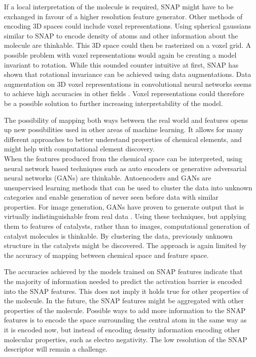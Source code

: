 If a local interpretation of the molecule is required, SNAP might have to be exchanged in favour of a higher resolution 
feature generator.
Other methods of encoding 3D spaces could include voxel representations.
Using spherical gaussians similar to SNAP to encode density of atoms and other information about the molecule are thinkable.
This 3D space could then be rasterized on a voxel grid.
A possible problem with voxel representations would again be creating a model invariant to rotation.
While this sounded counter intuitive at first, SNAP has shown that rotational invariance can be achieved using data augmentations.
Data augmentation on 3D voxel representations in convolutional neural networks seems to achieve high accuracies in 
other fields \cite{7353481}.
Voxel representations could therefore be a possible solution to further increasing interpretability of the model.

The possibility of mapping both ways between the real world and features opens up new possibilities 
used in other areas of machine learning.
It allows for many different approaches to better understand properties of chemical elements, 
and might help with computational element discovery.
\\

When the features produced from the chemical space can be interpreted,
using neural network based techniques such as auto encoders or generative adversarial neural networks (GANs) are thinkable.
Autoencoders and GANs are unsupervised learning methods that can be used to cluster the data into unknown categories 
and enable generation of never seen before data with similar properties.
For image generation, GANs have proven to generate output that is virtually indistinguishable from real data \cite{karras2019stylebased}.
Using these techniques, but applying them to features of catalysts, rather than to images, computational generation of catalyst molecules is thinkable.
By clustering the data, previously unknown structure in the catalysts might be discovered.
The approach is again limited by the accuracy of mapping between chemical space and feature space.

The accuracies achieved by the models trained on SNAP features indicate that 
the majority of information needed to predict the activation barrier is encoded into the SNAP features.
This does not imply it holds true for other properties of the molecule.
In the future, the SNAP features might be aggregated with other properties of the molecule.
Possible ways to add more information to the SNAP features is to encode the space surrounding the 
central atom in the same way as it is encoded now, but instead of encoding density information encoding 
other molecular properties, such as electro negativity.
The low resolution of the SNAP descriptor will remain a challenge.


